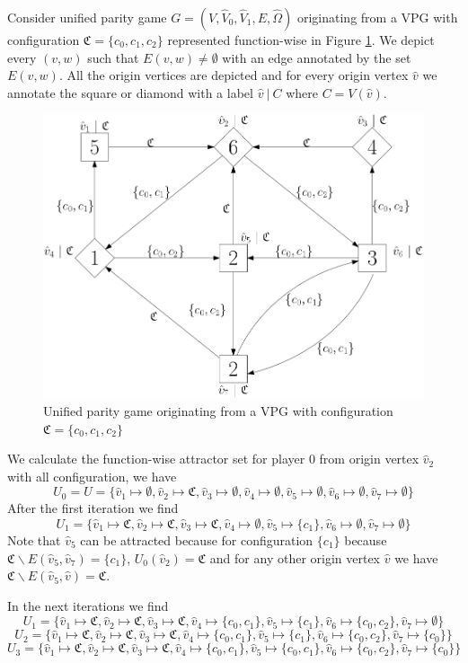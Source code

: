 \begin{example}
	Consider unified parity game $G = (V,\hat{V}_0,\hat{V}_1,E,\hat{\Omega})$ originating from a VPG with configuration $\mathfrak{C} = \{c_0,c_1,c_2\}$ represented function-wise in Figure \ref{fig:upg}. We depict every $(v,w)$ such that $E(v,w) \neq \emptyset$ with an edge annotated by the set $E(v,w)$. All the origin vertices are depicted and for every origin vertex $\hat{v}$ we annotate the square or diamond with a label $\hat{v}\ |\ C$ where $C = V(\hat{v})$.
	\begin{figure}[h]
		\centering
		\includegraphics[width=0.7\linewidth]{Examples/VPG/upg}
		\caption{Unified parity game originating from a VPG with configuration $\mathfrak{C} = \{c_0,c_1,c_2\}$}
		\label{fig:upg}
	\end{figure}
We calculate the function-wise attractor set for player 0 from origin vertex $\hat{v}_2$ with all configuration, we have
\[ U_0 = U = \{\hat{v}_1 \mapsto \emptyset, \hat{v}_2 \mapsto \mathfrak{C}, \hat{v}_3 \mapsto \emptyset, \hat{v}_4 \mapsto \emptyset, \hat{v}_5 \mapsto \emptyset, \hat{v}_6 \mapsto \emptyset, \hat{v}_7 \mapsto \emptyset\}\]
After the first iteration we find
\[U_1 = \{\hat{v}_1 \mapsto \mathfrak{C}, \hat{v}_2 \mapsto \mathfrak{C}, \hat{v}_3 \mapsto \mathfrak{C}, \hat{v}_4 \mapsto \emptyset, \hat{v}_5 \mapsto \{c_1\}, \hat{v}_6 \mapsto \emptyset, \hat{v}_7 \mapsto \emptyset\}\]
Note that $\hat{v}_5$ can be attracted because for configuration $\{c_1\}$ because $\mathfrak{C} \backslash E(\hat{v}_5,\hat{v}_7) = \{c_1\}$, $U_0(\hat{v}_2) = \mathfrak{C}$ and for any other origin vertex $\hat{v}$ we have $\mathfrak{C} \backslash E(\hat{v}_5,\hat{v}) = \mathfrak{C}$.

In the next iterations we find
\[U_1 = \{\hat{v}_1 \mapsto \mathfrak{C}, \hat{v}_2 \mapsto \mathfrak{C}, \hat{v}_3 \mapsto \mathfrak{C}, \hat{v}_4 \mapsto \{c_0,c_1\}, \hat{v}_5 \mapsto \{c_1\}, \hat{v}_6 \mapsto \{c_0,c_2\}, \hat{v}_7 \mapsto \emptyset\}\]
\[U_2 = \{\hat{v}_1 \mapsto \mathfrak{C}, \hat{v}_2 \mapsto \mathfrak{C}, \hat{v}_3 \mapsto \mathfrak{C}, \hat{v}_4 \mapsto \{c_0,c_1\}, \hat{v}_5 \mapsto \{c_1\}, \hat{v}_6 \mapsto \{c_0,c_2\}, \hat{v}_7 \mapsto \{c_0\}\}\]
\[U_3 = \{\hat{v}_1 \mapsto \mathfrak{C}, \hat{v}_2 \mapsto \mathfrak{C}, \hat{v}_3 \mapsto \mathfrak{C}, \hat{v}_4 \mapsto \{c_0,c_1\}, \hat{v}_5 \mapsto \{c_0,c_1\}, \hat{v}_6 \mapsto \{c_0,c_2\}, \hat{v}_7 \mapsto \{c_0\}\}\]


\end{example}
